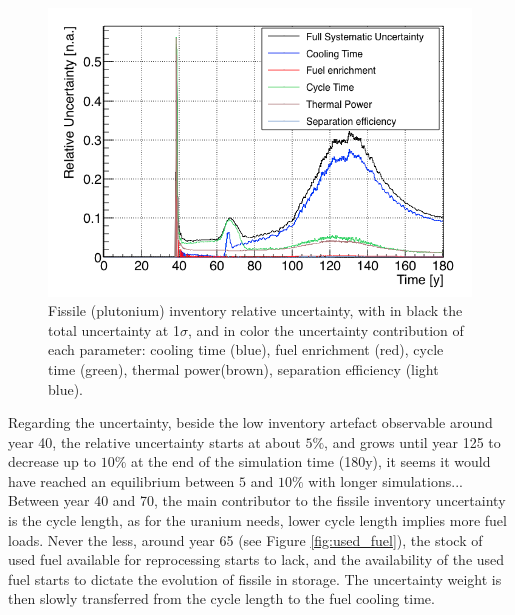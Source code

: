 \documentclass{anstrans}
\begin{document}
\begin{figure}[h!!] %
    \centering
    \includegraphics[scale=0.35]{pu_uncer}
    \caption{Fissile (plutonium) inventory relative uncertainty, with
    in black the total uncertainty at 1$\sigma$, and in color the uncertainty
    contribution of each parameter: cooling time (blue), fuel enrichment (red),
    cycle time (green), thermal power(brown), separation efficiency (light
    blue).}\label{fig:pu_uncer}
\end{figure}

Regarding the uncertainty, beside the low inventory artefact observable around
year 40, the relative uncertainty starts at about $5\%$, and grows until year
125 to decrease up to $10\%$ at the end of the simulation time (180y), it seems
it would have reached an equilibrium between $5$ and $10\%$ with longer
simulations...
Between year 40 and 70, the main contributor to the fissile inventory
uncertainty is the cycle length, as for the uranium needs, lower cycle length
implies more fuel loads.  Never the less, around year 65 (see Figure
\ref{fig:used_fuel}), the stock of used fuel available for reprocessing starts
to lack, and the availability of the used fuel starts to dictate the evolution
of fissile in storage.  The uncertainty weight is then slowly transferred from
the cycle length to the fuel cooling time.
\end{document}

